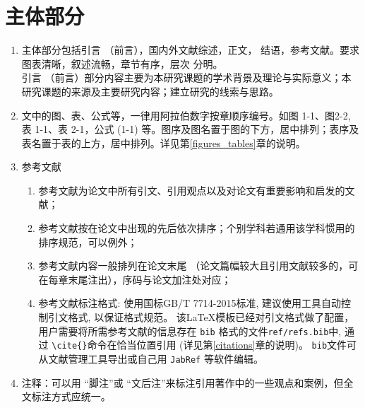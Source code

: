 \section{主体部分}
\begin{enumerate}
    \item 主体部分包括引言 （前言），国内外文献综述，正文， 结语，参考文献。要求图表清晰，叙述流畅，章节有序，层次 分明。\\
    引言 （前言）部分内容主要为本研究课题的学术背景及理论与实际意义；本研究课题的来源及主要研究内容；建立研究的线索与思路。

    \item 文中的图、表、公式等，一律用阿拉伯数字按章顺序编号。如图 1-1、图2-2, 表 1-1、表 2-1，公式 (1-1) 等。图序及图名置于图的下方，居中排列；表序及表名置于表的上方，居中排列。详见第\ref{figures_tables}章的说明。

    \item 参考文献
    \begin{enumerate}
        \item 参考文献为论文中所有引文、引用观点以及对论文有重要影响和启发的文献；
        \item 参考文献按在论文中出现的先后依次排序；个别学科若通用该学科惯用的排序规范，可以例外；
        \item 参考文献内容一般排列在论文末尾 （论文篇幅较大且引用文献较多的，可在每章末尾注出），序码与论文加注处对应；
        \item 参考文献标注格式: 使用国标GB/T 7714-2015标准, 建议使用工具自动控制引文格式, 
        以保证格式规范。
        该\LaTeX{}模板已经对引文格式做了配置，
        用户需要将所需参考文献的信息存在 \texttt{bib} 格式的文件\texttt{ref/refs.bib}中, 
        通过 \verb|\cite{}|命令在恰当位置引用 (详见第\ref{citations}章的说明)。
        \texttt{bib}文件可从文献管理工具导出或自己用 \texttt{JabRef} 等软件编辑。
    \end{enumerate}

    \item 注释：可以用 “脚注”或 “文后注”来标注引用著作中的一些观点和案例，但全文标注方式应统一。
\end{enumerate}

